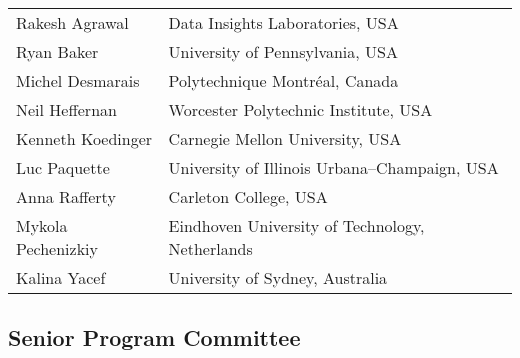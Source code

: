 \documentclass[letterpaper,11pt,oneside]{book} %
\newcommand{\nocontentsline}[3]{}
\newcommand{\tocless}[2]{\bgroup\let\addcontentsline=\nocontentsline#1{#2}\egroup}
\begin{document}
\begin{longtable}[]{@{}ll@{}}
& \\
\endhead
Rakesh Agrawal & Data Insights Laboratories, USA \\
Ryan Baker & University of Pennsylvania, USA \\
Michel Desmarais & Polytechnique Montréal, Canada \\
Neil Heffernan & Worcester Polytechnic Institute, USA \\
Kenneth Koedinger & Carnegie Mellon University, USA \\
Luc Paquette & University of Illinois Urbana--Champaign, USA \\
Anna Rafferty & Carleton College, USA \\
Mykola Pechenizkiy & Eindhoven University of Technology, Netherlands \\
Kalina Yacef & University of Sydney, Australia \\
\end{longtable}


\tocless\subsection{Senior Program Committee}%
\end{document}
